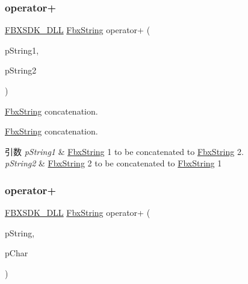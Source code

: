 \subsubsection{\texorpdfstring{operator+}{operator+}\hspace{0.1cm}{\footnotesize\ttfamily [1/10]}}
{\footnotesize\ttfamily \hyperlink{fbxarch_8h_a25d1298b33c31da5dbed969e0d4b4bc1}{F\+B\+X\+S\+D\+K\+\_\+\+D\+LL} \hyperlink{class_fbx_string}{Fbx\+String} operator+ (\begin{DoxyParamCaption}\item[{const \hyperlink{class_fbx_string}{Fbx\+String} \&}]{p\+String1,  }\item[{const \hyperlink{class_fbx_string}{Fbx\+String} \&}]{p\+String2 }\end{DoxyParamCaption})\hspace{0.3cm}{\ttfamily [friend]}}



\hyperlink{class_fbx_string}{Fbx\+String} concatenation. 

\hyperlink{class_fbx_string}{Fbx\+String} concatenation. 
\begin{DoxyParams}{引数}
{\em p\+String1} & \hyperlink{class_fbx_string}{Fbx\+String} 1 to be concatenated to \hyperlink{class_fbx_string}{Fbx\+String} 2. \\
\hline
{\em p\+String2} & \hyperlink{class_fbx_string}{Fbx\+String} 2 to be concatenated to \hyperlink{class_fbx_string}{Fbx\+String} 1 \\
\hline
\end{DoxyParams}
\mbox{\label{class_fbx_string_a900b603cd32d01c50eb97c3accdca223}} 
\subsubsection{\texorpdfstring{operator+}{operator+}\hspace{0.1cm}{\footnotesize\ttfamily [2/10]}}
{\footnotesize\ttfamily \hyperlink{fbxarch_8h_a25d1298b33c31da5dbed969e0d4b4bc1}{F\+B\+X\+S\+D\+K\+\_\+\+D\+LL} \hyperlink{class_fbx_string}{Fbx\+String} operator+ (\begin{DoxyParamCaption}\item[{const \hyperlink{class_fbx_string}{Fbx\+String} \&}]{p\+String,  }\item[{char}]{p\+Char }\end{DoxyParamCaption})\hspace{0.3cm}{\ttfamily [friend]}}



